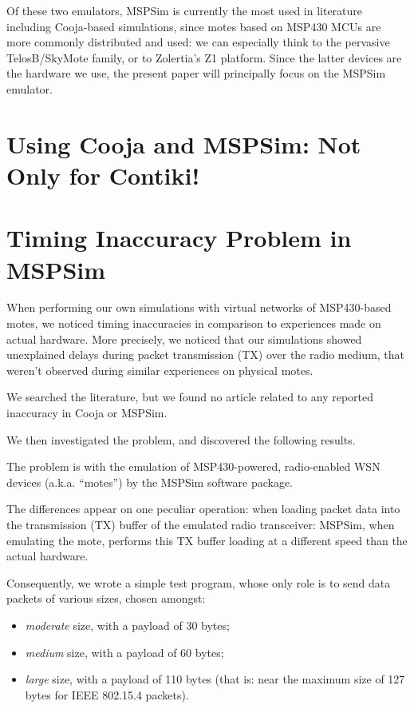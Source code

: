 \documentclass[10pt]{ewsn-proc}
\begin{document}
Of these two emulators, MSPSim is currently the most used in literature
including Cooja-based simulations, since motes based on MSP430 MCUs are
more commonly distributed and used: we can especially think to the pervasive
TelosB/SkyMote family, or to Zolertia's Z1 platform. Since the latter
devices are the hardware we use, the present paper will principally
focus on the MSPSim emulator.



\section{Using Cooja and MSPSim: Not Only for Contiki!}
\label{newUses}



\section{Timing Inaccuracy Problem in MSPSim}
\label{results}

When performing our own simulations with virtual networks of MSP430-based
motes, we noticed timing inaccuracies in comparison to experiences made
on actual hardware. More precisely, we noticed that our simulations showed
unexplained delays during packet transmission (TX) over the radio medium,
that weren't observed during similar experiences on physical motes.

We searched the literature, but we found no article related to any reported
inaccuracy in Cooja or MSPSim.

We then investigated the problem, and discovered the following results.

The problem is with the emulation of MSP430-powered, radio-enabled WSN
devices (a.k.a. ``motes'') by the MSPSim software package.

The differences appear on one peculiar operation: when loading packet data
into the transmission (TX) buffer of the emulated radio transceiver:
MSPSim, when emulating the mote, performs this TX buffer loading at
a different speed than the actual hardware.

Consequently, we wrote a simple test program, whose only role is to send
data packets of various sizes, chosen amongst:
\begin{itemize}
\item \emph{moderate} size, with a payload of 30 bytes;
\item \emph{medium} size, with a payload of 60 bytes;
\item \emph{large} size, with a payload of 110 bytes (that is:
      near the maximum size of 127 bytes for IEEE 802.15.4 packets).
\end{itemize}
\end{document}
